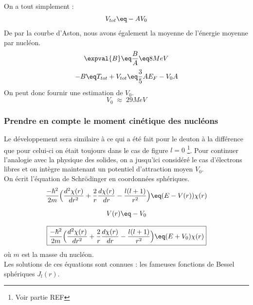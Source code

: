 On a tout simplement :
\begin{equation*}
    V_{tot} \eq -A V_0
\end{equation*}
De par la courbe d'Aston, nous avons également la moyenne de l'énergie moyenne par nucléon.
\begin{equation*}
    \expval{B} \eq \frac{B}{A} \eq 8MeV
\end{equation*}
\begin{equation*}
    -B \eq T_{tot} + V_{tot} \eq \frac{3}{5}A E_F - V_0 A
\end{equation*}
On peut donc fournir une estimation de $V_0$.
\begin{equation*}
    V_0 \; \approx \; 29MeV
\end{equation*}
\subsubsection{Prendre en compte le moment cinétique des nucléons}
Le développement sera similaire à ce qui a été fait pour le deuton à la différence que pour celui-ci on était toujours dans le cas de figure $l=0$ \footnote{Voir partie REF}. Pour continuer l'analogie avec la physique des solides, on a jusqu'ici considéré le cas d'électrons libres et on intègre maintenant un potentiel d'attraction moyen $V_0$.\\
On écrit l'équation de Schrödinger en coordonnées sphériques.
\begin{equation*}
       \frac{-\hbar^2}{2m} \Big(\dfrac{d^2\chi(r)}{dr^2} + \frac{2}{r}\dfrac{d\chi(r)}{dr} - \frac{l(l+1)}{r^2}\Big)\eq (E-V(r))\chi(r)
\end{equation*}

\begin{equation*}
    V(r) \eq -V_0
\end{equation*}

\begin{equation*}
    \boxed{
       \frac{-\hbar^2}{2m} \Big(\dfrac{d^2\chi(r)}{dr^2} + \frac{2}{r}\dfrac{d\chi(r)}{dr} - \frac{l(l+1)}{r^2}\Big)\eq (E+V_0)\chi(r)
    }
\end{equation*}
où $m$ est la masse du nucléon.\\
Les solutions de ces équations sont connues : les fameuses fonctions de Bessel sphériques $J_l(r)$.
